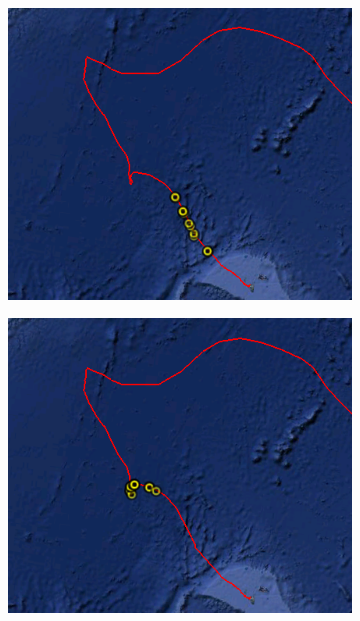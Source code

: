 \documentclass[a4paper,12pt,oneside]{book}
\begin{document}
\begin{figure}[ht]
\centering
    \begin{subfigure}[ht]{0.3\textwidth}
    \centering
        \includegraphics[width=\textwidth]{./images/shark_move_1.png}
    \label{fig:shark1}
    \end{subfigure}
    \begin{subfigure}[ht]{0.3\textwidth}
    \centering
        \includegraphics[width=\textwidth]{./images/shark_move_2.png}
    \label{fig:shark2}

\end{subfigure}
\end{figure}
\end{document}
